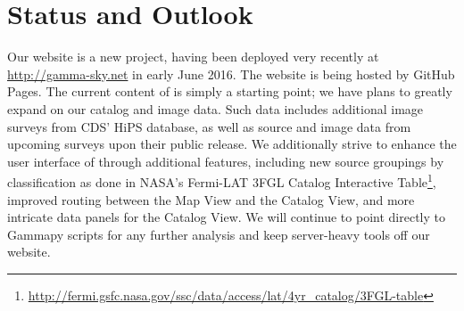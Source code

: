 \section{Status and Outlook}


Our website is a new project, having been deployed very recently at \url{http://gamma-sky.net} in early June 2016. The website is being hosted by GitHub Pages. The current content of \gammasky is simply a starting point; we have plans to greatly expand on our catalog and image data. Such data includes additional image surveys from CDS' HiPS database, as well as source and image data from upcoming surveys upon their public release. We additionally strive to enhance the user interface of \gammasky through additional features, including new source groupings by classification as done in NASA's Fermi-LAT 3FGL Catalog Interactive Table\footnote[5]{\url{http://fermi.gsfc.nasa.gov/ssc/data/access/lat/4yr_catalog/3FGL-table}}, improved routing between the Map View and the Catalog View, and more intricate data panels for the Catalog View. We will continue to point directly to Gammapy scripts for any further analysis and keep server-heavy tools off our website.
